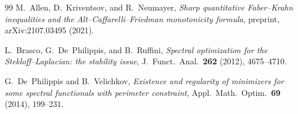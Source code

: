 \documentclass[11pt]{amsart}
\theoremstyle{definition}
\begin{document}
\begin{thebibliography}{99}
M.~Allen, D.~Kriventsov, and R.~Neumayer,
\emph{Sharp quantitative Faber--Krahn inequalities and the Alt--Caffarelli--Friedman
monotonicity formula},
preprint, arXiv:2107.03495 (2021).

L.~Brasco, G.~De~Philippis, and B.~Ruffini,
\emph{Spectral optimization for the Stekloff--Laplacian: the stability
issue},
J.\ Funct.\ Anal.\ \textbf{262} (2012), 4675--4710.

G.~De~Philippis and B.~Velichkov,
\emph{Existence and regularity of minimizers for some spectral functionals
with perimeter constraint},
Appl.\ Math.\ Optim.\ \textbf{69} (2014), 199--231.

\end{thebibliography}
\end{document}
